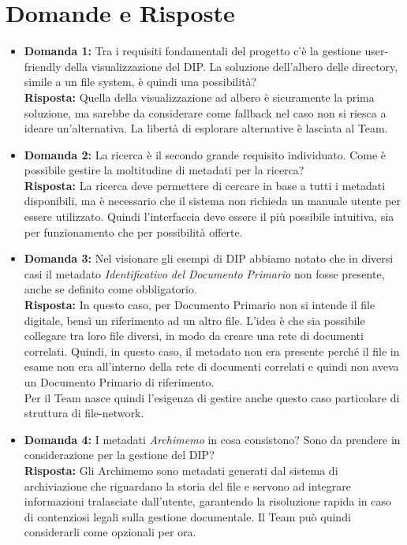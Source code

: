 \documentclass[a4paper,12pt]{article}
\begin{document}
\section{Domande e Risposte} \label{qa}
\begin{itemize}
    \item \textbf{Domanda 1:} Tra i requisiti fondamentali del progetto c'è la gestione user-friendly della visualizzazione del DIP. La soluzione dell'albero delle directory, simile a un file system, è quindi una possibilità?\\
    	\textbf{Risposta:} Quella della visualizzazione ad albero è sicuramente la prima soluzione, ma sarebbe da considerare come fallback nel caso non si riesca a ideare un'alternativa. La libertà di esplorare alternative è lasciata al Team.
    
    \item \textbf{Domanda 2:} La ricerca è il secondo grande requisito individuato. Come è possibile gestire la moltitudine di metadati per la ricerca?
    \\ \textbf{Risposta:} La ricerca deve permettere di cercare in base a tutti i metadati disponibili, ma è necessario che il sistema non richieda un manuale utente per essere utilizzato. Quindi l'interfaccia deve essere il più possibile intuitiva, sia per funzionamento che per possibilità offerte.

    \item \textbf{Domanda 3:} Nel visionare gli esempi di DIP abbiamo notato che in diversi casi il metadato \textit{Identificativo del Documento Primario} non fosse presente, anche se definito come obbligatorio.
    \\ \textbf{Risposta:} In questo caso, per Documento Primario non si intende il file digitale, bensì un riferimento ad un altro file. L'idea è che sia possibile collegare tra loro file diversi, in modo da creare una rete di documenti correlati. 
    Quindi, in questo caso, il metadato non era presente perché il file in esame non era all'interno della rete di documenti correlati e quindi non aveva un Documento Primario di riferimento.
    \\ Per il Team nasce quindi l'esigenza di gestire anche questo caso particolare di struttura di file-network.

    \item \textbf{Domanda 4:} I metadati \textit{Archimemo} in cosa consistono? Sono da prendere in considerazione per la gestione del DIP?
    \\ \textbf{Risposta:} Gli Archimemo sono metadati generati dal sistema di archiviazione che riguardano la storia del file e servono ad integrare informazioni tralasciate dall'utente, garantendo la risoluzione rapida in caso di contenziosi legali sulla gestione documentale. Il Team può quindi considerarli come opzionali per ora.


\end{itemize}
\end{document}
